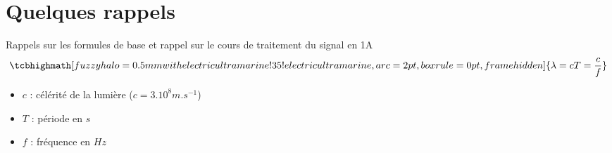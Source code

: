 \chapter*{Quelques rappels}
Rappels sur les formules de base et rappel sur le cours de traitement du signal en 1A
\begin{equation}
    \normalsize
    \tcbhighmath[fuzzy halo=0.5mm with electricultramarine!35!electricultramarine,arc=2pt,
    boxrule=0pt,frame hidden]{ 
        \lambda = cT = \frac{c}{f}
     } \nonumber
    \normalsize
\end{equation}
\begin{itemize}
    \item $c$ : célérité de la lumière ($c = 3.10^{8} m.s^{-1}$)
    \item $T$ : période en $s$
    \item $f$ : fréquence en $Hz$
\end{itemize}